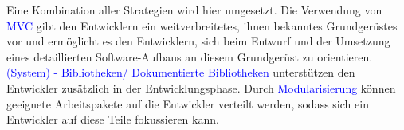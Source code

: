 \documentclass[enabledeprecatedfontcommands,fontsize=11pt,paper=a4,twoside]{scrartcl}
\newcounter{one}
\newcommand{\cb}[1]{{\textcolor{blue}{#1}}}
\begin{document}
\begin{onehalfspace}
	Eine Kombination aller Strategien wird hier umgesetzt. Die Verwendung von \cb{MVC} gibt den Entwicklern ein weitverbreitetes, ihnen bekanntes Grundgerüstes vor und ermöglicht es den Entwicklern, sich beim Entwurf und der Umsetzung eines detaillierten Software-Aufbaus an diesem Grundgerüst zu orientieren. \cb{(System) - Bibliotheken/ Dokumentierte Bibliotheken} unterstützen den Entwickler zusätzlich in der Entwicklungsphase.
	Durch \cb{Modularisierung} können geeignete Arbeitspakete auf die Entwickler verteilt werden, sodass sich ein Entwickler auf diese Teile fokussieren kann. \\ \\ \\ \\
\end{onehalfspace}
\newpage
\end{document}
